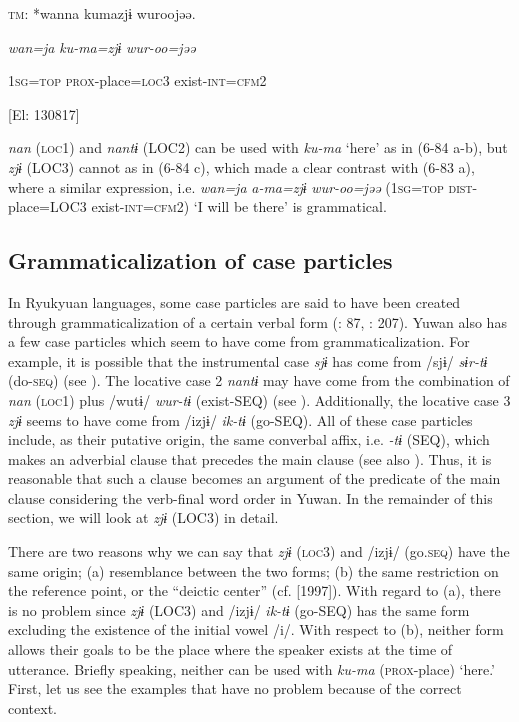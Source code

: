     \textsc{tm}:  *wanna  kumazjɨ  wuroojəə.

      \textit{wan=ja}  \textit{ku-ma=zjɨ}  \textit{wur-oo=jəə}

      1\textsc{sg}=\textsc{top}  \textsc{prox}-place=\textsc{loc}3  exist-\textsc{int}=\textsc{cfm}2

      [El: 130817]

\textit{nan} (\textsc{loc}1) and \textit{nantɨ} (LOC2) can be used with \textit{ku-ma} ‘here’ as in (6-84 a-b), but \textit{zjɨ} (LOC3) cannot as in (6-84 c), which made a clear contrast with (6-83 a), where a similar expression, i.e. \textit{wan=ja} \textit{a-ma=zjɨ} \textit{wur-oo=jəə} (1\textsc{sg}=\textsc{top} \textsc{dist}-place=LOC3 exist-\textsc{int}=\textsc{cfm}2) ‘I will be there’ is grammatical.

\subsection{Grammaticalization of case particles}

In Ryukyuan languages, some case particles are said to have been created through grammaticalization of a certain verbal form (\citealt{NishiokaNakahara2000}: 87, \citealt{Shimoji2008}: 207). Yuwan also has a few case particles which seem to have come from grammaticalization. For example, it is possible that the instrumental case \textit{sjɨ} has come from /sjɨ/ \textit{sɨr-tɨ} (do-\textsc{seq}) (see ). The locative case 2 \textit{nantɨ} may have come from the combination of \textit{nan} (\textsc{loc}1) plus /wutɨ/ \textit{wur-tɨ} (exist-SEQ) (see ). Additionally, the locative case 3 \textit{zjɨ} seems to have come from /izjɨ/ \textit{ik-tɨ} (go-SEQ). All of these case particles include, as their putative origin, the same converbal affix, i.e. \textit{{}-tɨ} (SEQ), which makes an adverbial clause that precedes the main clause (see also ). Thus, it is reasonable that such a clause becomes an argument of the predicate of the main clause considering the verb-final word order in Yuwan. In the remainder of this section, we will look at \textit{zjɨ} (LOC3) in detail.

There are two reasons why we can say that \textit{zjɨ} (\textsc{loc}3) and /izjɨ/ (go.\textsc{seq}) have the same origin; (a) resemblance between the two forms; (b) the same restriction on the reference point, or the “deictic center” (cf. \citealt{Fillmore1971} [1997]). With regard to (a), there is no problem since \textit{zjɨ} (LOC3) and /izjɨ/ \textit{ik-tɨ} (go-SEQ) has the same form excluding the existence of the initial vowel /i/. With respect to (b), neither form allows their goals to be the place where the speaker exists at the time of utterance. Briefly speaking, neither can be used with \textit{ku-ma} (\textsc{prox}-place) ‘here.’ First, let us see the examples that have no problem because of the correct context.

